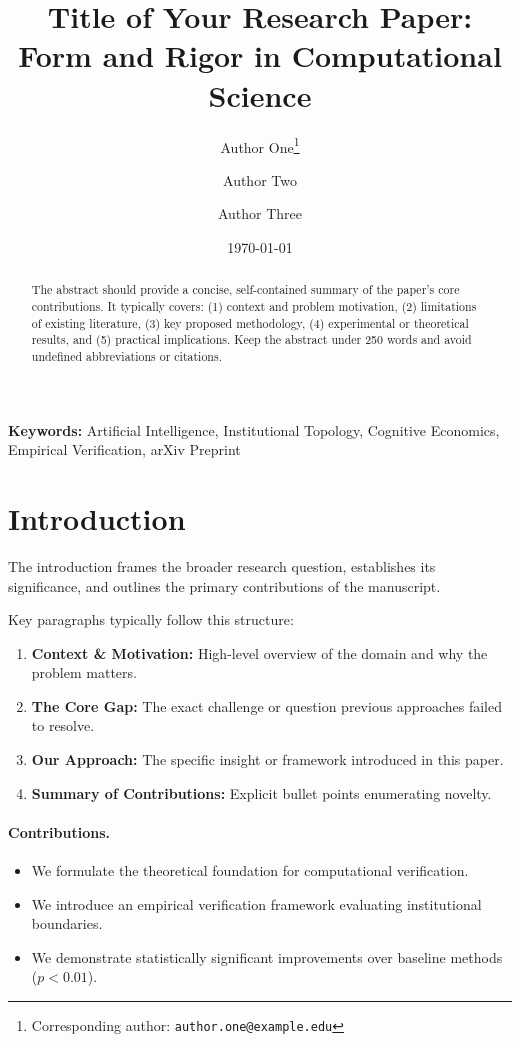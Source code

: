 \documentclass[11pt,a4paper]{article}
\title{\textbf{Title of Your Research Paper: Form and Rigor in Computational Science}}
\author[1]{Author One\thanks{Corresponding author: \texttt{author.one@example.edu}}}
\author[1,2]{Author Two}
\author[2]{Author Three}
\affil[1]{Department of Computer Science, University of Research}
\affil[2]{Institute for Advanced AI Studies}
\date{\today}
\begin{document}
\maketitle

\begin{abstract}
The abstract should provide a concise, self-contained summary of the paper's core contributions. It typically covers: (1) context and problem motivation, (2) limitations of existing literature, (3) key proposed methodology, (4) experimental or theoretical results, and (5) practical implications. Keep the abstract under 250 words and avoid undefined abbreviations or citations.
\end{abstract}

\textbf{Keywords:} Artificial Intelligence, Institutional Topology, Cognitive Economics, Empirical Verification, arXiv Preprint

\section{Introduction}
\label{sec:intro}
The introduction frames the broader research question, establishes its significance, and outlines the primary contributions of the manuscript. 

Key paragraphs typically follow this structure:
\begin{enumerate}
    \item \textbf{Context \& Motivation:} High-level overview of the domain and why the problem matters.
    \item \textbf{The Core Gap:} The exact challenge or question previous approaches failed to resolve.
    \item \textbf{Our Approach:} The specific insight or framework introduced in this paper.
    \item \textbf{Summary of Contributions:} Explicit bullet points enumerating novelty.
\end{enumerate}

\paragraph{Contributions.}
\begin{itemize}
    \item We formulate the theoretical foundation for computational verification.
    \item We introduce an empirical verification framework evaluating institutional boundaries.
    \item We demonstrate statistically significant improvements over baseline methods ($p < 0.01$).
\end{itemize}
\end{document}
